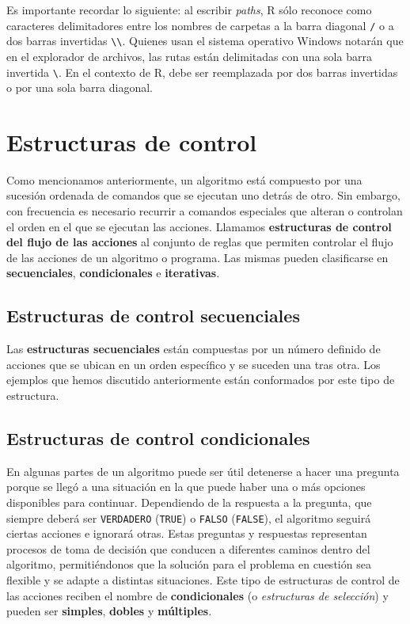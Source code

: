 \documentclass[
]{book}
\begin{document}
Es importante recordar lo siguiente: al escribir \emph{paths}, R sólo reconoce como caracteres delimitadores entre los nombres de carpetas a la barra diagonal \texttt{/} o a dos barras invertidas \texttt{\textbackslash{}\textbackslash{}}. Quienes usan el sistema operativo Windows notarán que en el explorador de archivos, las rutas están delimitadas con una sola barra invertida \texttt{\textbackslash{}}. En el contexto de R, debe ser reemplazada por dos barras invertidas o por una sola barra diagonal.

\hypertarget{estructuras-de-control}{%
\chapter{Estructuras de control}\label{estructuras-de-control}}

Como mencionamos anteriormente, un algoritmo está compuesto por una sucesión ordenada de comandos que se ejecutan uno detrás de otro. Sin embargo, con frecuencia es necesario recurrir a comandos especiales que alteran o controlan el orden en el que se ejecutan las acciones. Llamamos \textbf{estructuras de control del flujo de las acciones} al conjunto de reglas que permiten controlar el flujo de las acciones de un algoritmo o programa. Las mismas pueden clasificarse en \textbf{secuenciales}, \textbf{condicionales} e \textbf{iterativas}.

\hypertarget{estructuras-de-control-secuenciales}{%
\section{Estructuras de control secuenciales}\label{estructuras-de-control-secuenciales}}

Las \textbf{estructuras secuenciales} están compuestas por un número definido de acciones que se ubican en un orden específico y se suceden una tras otra. Los ejemplos que hemos discutido anteriormente están conformados por este tipo de estructura.

\hypertarget{estructuras-de-control-condicionales}{%
\section{Estructuras de control condicionales}\label{estructuras-de-control-condicionales}}

En algunas partes de un algoritmo puede ser útil detenerse a hacer una pregunta porque se llegó a una situación en la que puede haber una o más opciones disponibles para continuar. Dependiendo de la respuesta a la pregunta, que siempre deberá ser \texttt{VERDADERO} (\texttt{TRUE}) o \texttt{FALSO} (\texttt{FALSE}), el algoritmo seguirá ciertas acciones e ignorará otras. Estas preguntas y respuestas representan procesos de toma de decisión que conducen a diferentes caminos dentro del algoritmo, permitiéndonos que la solución para el problema en cuestión sea flexible y se adapte a distintas situaciones. Este tipo de estructuras de control de las acciones reciben el nombre de \textbf{condicionales} (o \emph{estructuras de selección}) y pueden ser \textbf{simples}, \textbf{dobles} y \textbf{múltiples}.
\end{document}

